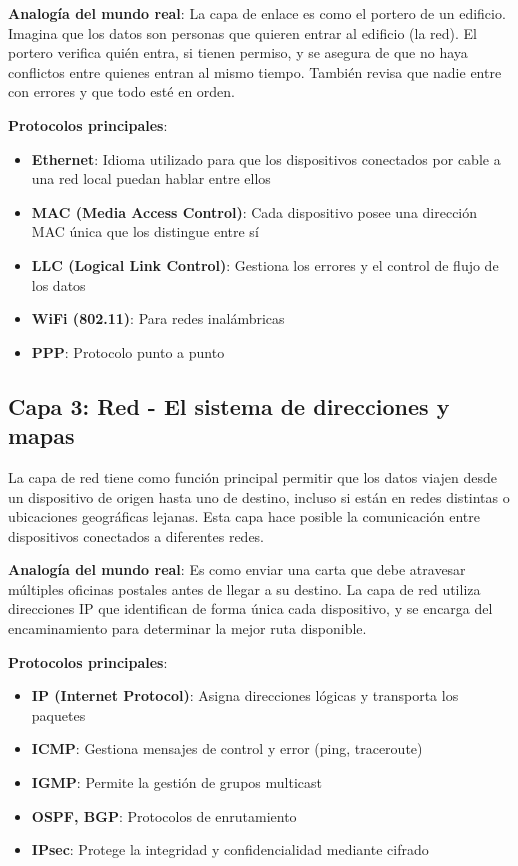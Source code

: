 \textbf{Analogía del mundo real}: La capa de enlace es como el portero de un edificio. Imagina que los datos son personas que quieren entrar al edificio (la red). El portero verifica quién entra, si tienen permiso, y se asegura de que no haya conflictos entre quienes entran al mismo tiempo. También revisa que nadie entre con errores y que todo esté en orden.

\textbf{Protocolos principales}:
\begin{itemize}
    \item \textbf{Ethernet}: Idioma utilizado para que los dispositivos conectados por cable a una red local puedan hablar entre ellos
    \item \textbf{MAC (Media Access Control)}: Cada dispositivo posee una dirección MAC única que los distingue entre sí
    \item \textbf{LLC (Logical Link Control)}: Gestiona los errores y el control de flujo de los datos
    \item \textbf{WiFi (802.11)}: Para redes inalámbricas
    \item \textbf{PPP}: Protocolo punto a punto
\end{itemize}

\subsection{Capa 3: Red - El sistema de direcciones y mapas}

La capa de red tiene como función principal permitir que los datos viajen desde un dispositivo de origen hasta uno de destino, incluso si están en redes distintas o ubicaciones geográficas lejanas. Esta capa hace posible la comunicación entre dispositivos conectados a diferentes redes.

\textbf{Analogía del mundo real}: Es como enviar una carta que debe atravesar múltiples oficinas postales antes de llegar a su destino. La capa de red utiliza direcciones IP que identifican de forma única cada dispositivo, y se encarga del encaminamiento para determinar la mejor ruta disponible.

\textbf{Protocolos principales}:
\begin{itemize}
    \item \textbf{IP (Internet Protocol)}: Asigna direcciones lógicas y transporta los paquetes
    \item \textbf{ICMP}: Gestiona mensajes de control y error (ping, traceroute)
    \item \textbf{IGMP}: Permite la gestión de grupos multicast
    \item \textbf{OSPF, BGP}: Protocolos de enrutamiento
    \item \textbf{IPsec}: Protege la integridad y confidencialidad mediante cifrado
\end{itemize}

